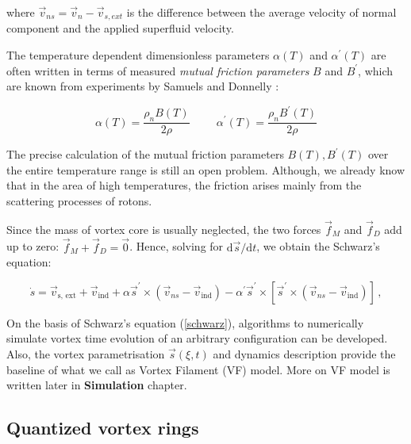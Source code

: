 where $\vec{v}_{ns} = \vec{v}_{n} - \vec{v}_{s,ext}$ is the difference between the average velocity of normal component and the applied superfluid velocity.

The temperature dependent dimensionless parameters $\alpha(T)$ and $\alpha^{\prime}(T)$ are often written in terms of measured \textit{mutual friction parameters} $B$ and $B^{\prime}$, which are known from experiments by Samuels and Donnelly \cite{donnelly}:

\begin{equation}
\alpha(T) = \frac{\rho_n B(T)}{2\rho}
\hspace{1cm}
\alpha^{\prime}(T) = \frac{\rho_n B^{\prime}(T)}{2\rho}
\end{equation}

The precise calculation of the mutual friction parameters $B(T), B^{\prime}(T)$ over the entire temperature range is still an open problem. Although, we already know that in the area of high temperatures, the friction arises mainly from the scattering processes of rotons.

\newpage

Since the mass of vortex core is usually neglected, the two forces $\vec{f}_M$ and $\vec{f}_D$ add up to zero: $\vec{f}_M + \vec{f}_D = \vec{0}$. Hence, solving for $\text{d}\vec{s} / \text{d} t$, we obtain \cite{schwarz} the Schwarz's equation:

\begin{equation}
\dot{s} = \vec{v}_{\text{s, ext}} + \vec{v}_{\text{ind}}
+ \alpha\vec{s}^{\prime} \times (\vec{v}_{ns} - \vec{v}_{\text{ind}})
- \alpha^{\prime}\vec{s}^{\prime} \times [\vec{s}^{\prime} \times (\vec{v}_{ns} - \vec{v}_{\text{ind}})]\,,
\label{schwarz}
\end{equation}

On the basis of Schwarz's equation (\ref{schwarz}), algorithms to numerically simulate vortex time evolution of an arbitrary configuration can be developed. Also, the vortex parametrisation $\vec{s}(\xi, t)$ and dynamics description provide the baseline of what we call as Vortex Filament (VF) model. More on VF model is written later in \textbf{Simulation} chapter.



\subsection*{Quantized vortex rings}

